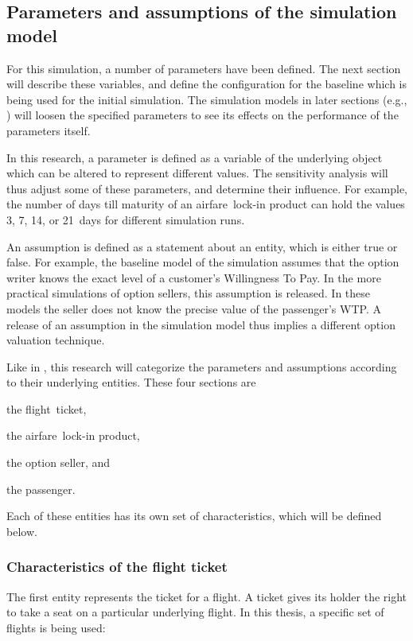 \subsection{Parameters and assumptions of the simulation model}
For this simulation, a number of parameters have been defined. The next section will describe these variables, and define the configuration for the baseline which is being used for the initial simulation. The simulation models in later sections (e.g., ) will loosen the specified parameters to see its effects on the performance of the parameters itself.

In this research, a parameter is defined as a variable of the underlying object which can be altered to represent different values. The sensitivity analysis will thus adjust some of these parameters, and determine their influence. For example, the number of days till maturity of an airfare~lock-in product can hold the values 3, 7, 14, or 21~days for different simulation runs.

An assumption is defined as a statement about an entity, which is either true or false. For example, the baseline model of the simulation assumes that the option writer knows the exact level of a customer's Willingness To Pay. In the more practical simulations of option sellers, this assumption is released. In these models the seller does not know the precise value of the passenger's WTP. A release of an assumption in the simulation model thus implies a different option valuation technique.


Like in , this research will categorize the parameters and assumptions according to their underlying entities. These four sections are \begin{inparaenum}
\item the flight~ticket,
\item the airfare~lock-in product,
\item the option seller, and
\item the passenger.
\end{inparaenum} Each of these entities has its own set of characteristics, which will be defined below.

\subsubsection{Characteristics of the flight ticket}
\label{sub:CharacteristicsOfTheFlightTicket}
The first entity represents the ticket for a flight. A ticket gives its holder the right to take a seat on a particular underlying flight. In this thesis, a specific set of flights is being used:

